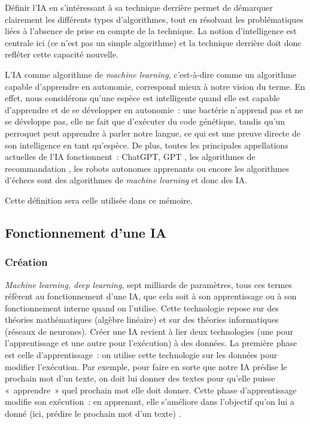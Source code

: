 \documentclass[a4paper, titlepage, 12pt]{article}
\begin{document}
	Définir l'IA en s'intéressant à sa technique derrière permet de démarquer clairement les différents types d'algorithmes, tout en résolvant les problématiques liées à l'absence de prise en compte de la technique. La notion d'intelligence est centrale ici (ce n'est pas un simple algorithme) et la technique derrière doit donc refléter cette capacité nouvelle.

	L'IA comme algorithme de \textit{machine learning}, c'est-à-dire comme un algorithme capable d'apprendre en autonomie, correspond mieux à notre vision du terme. En effet, nous considérons qu'une espèce est intelligente quand elle est capable d'apprendre et de se développer en autonomie~: une bactérie n'apprend pas et ne se développe pas, elle ne fait que d'exécuter du code génétique, tandis qu'un perroquet peut apprendre à parler notre langue, ce qui est une preuve directe de son intelligence en tant qu'espèce. De plus, toutes les principales appellations actuelles de l'IA fonctionnent~: ChatGPT, GPT \cite{ApprentissageAutomatique2025}, les algorithmes de recommandation \cite{nguyenhoangMillionMilliardsDilemmes2021}, les robots autonomes apprenants ou encore les algorithmes d'échecs sont des algorithmes de \textit{machine learning} et donc des IA.

	Cette définition sera celle utilisée dans ce mémoire.

	\subsection{Fonctionnement d'une IA}
	\subsubsection{Création}
	\textit{Machine learning, deep learning}, sept milliards de paramètres, tous ces termes réfèrent au fonctionnement d'une IA, que cela soit à son apprentissage ou à son fonctionnement interne quand on l'utilise. Cette technologie repose sur des théories mathématiques (algèbre linéaire) et sur des théories informatiques (réseaux de neurones). Créer une IA revient à lier deux technologies (une pour l'apprentissage et une autre pour l'exécution) à des données. La première phase est celle d'apprentissage~: on utilise cette technologie sur les données pour modifier l'exécution. Par exemple, pour faire en sorte que notre IA prédise le prochain mot d'un texte, on doit lui donner des textes pour qu'elle puisse «~apprendre~» quel prochain mot elle doit donner. Cette phase d'apprentissage modifie son exécution~: en apprenant, elle s'améliore dans l'objectif qu'on lui a donné (ici, prédire le prochain mot d'un texte) \cite{nguyenhoangDonneesManipulentAlgorithmes2021}.
\end{document}
